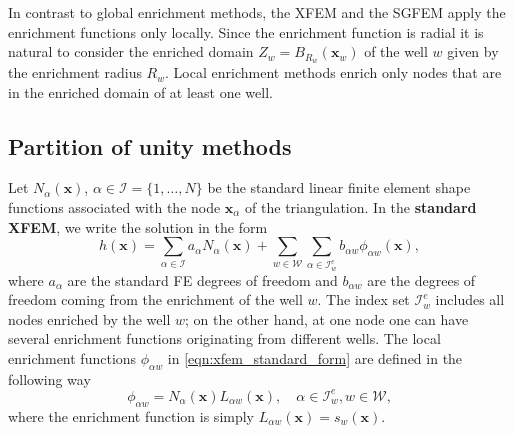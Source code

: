 \documentclass{elsarticle}
\def\vc#1{\mathbf{\boldsymbol{#1}}}     %
\newcommand{\bx}{\vc{x}}
\begin{document}
In contrast to global enrichment methods, the XFEM and the SGFEM apply the enrichment functions only locally. 
Since the enrichment function is radial it is natural to consider the enriched domain $Z_w = B_{R_w}(\vc x_w)$
of the well $w$ given by the enrichment radius $R_w$. Local enrichment methods enrich only 
nodes that are in the enriched domain of at least one well.

\subsection{Partition of unity methods}
\label{sec:pum_methods}
Let $N_\alpha(\bx)$, $\alpha\in\mathcal{I}=\{1,\ldots,N\}$ be the standard linear finite element shape 
functions associated with the node $\bx_\alpha$ of the triangulation. 
In the \textbf{standard XFEM}, we write the solution in the form
\begin{equation} \label{eqn:xfem_standard_form}
  h(\bx) = \sum \limits_{\alpha\in\mathcal{I}}a_\alpha N_\alpha(\bx)
    + \sum \limits_{w\in\mathcal{W}} \sum \limits_{\alpha\in\mathcal{I}^e_w} b_{\alpha w} \phi_{\alpha w}(\bx),
\end{equation}
where $a_\alpha$ are the standard FE degrees of freedom and $b_{\alpha w}$ are the degrees of freedom coming from
the enrichment of the well $w$. The index set $\mathcal{I}^e_w$ includes all nodes enriched by the well $w$; on the other hand, 
at one node one can have several enrichment functions originating from different wells.
The local enrichment functions $\phi_{\alpha w}$ in \eqref{eqn:xfem_standard_form} are defined
in the following way
\begin{equation} \label{eqn:xfem_enrich}
    \phi_{\alpha w} = N_\alpha(\bx)L_{\alpha w}(\bx), \quad \alpha\in\mathcal{I}^e_w, w\in\mathcal{W},
\end{equation}
where the enrichment function is simply $L_{\alpha w}(\bx) = s_w(\bx)$.
\end{document}
